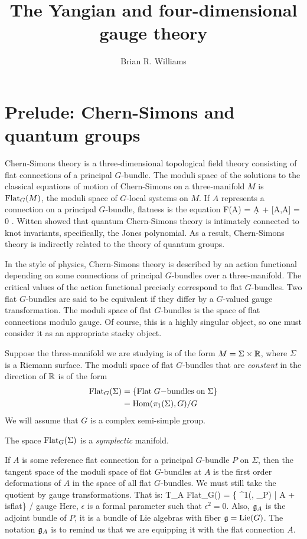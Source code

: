 \documentclass[10pt]{amsart}
\title{The Yangian and four-dimensional gauge theory}
\author{Brian R. Williams}
\date{}
\begin{document}
\maketitle

\section{Prelude: Chern-Simons and quantum groups}

Chern-Simons theory is a three-dimensional topological field theory consisting of flat connections of a principal $G$-bundle. 
The moduli space of the solutions to the classical equations of motion of Chern-Simons on a three-manifold $M$ is ${\rm Flat}_G(M)$, the moduli space of $G$-local systems on $M$. 
If $A$ represents a connection on a principal $G$-bundle, flatness is the equation
\ben 
F(A) = \d A +  [A,A] = 0 .
\een 
Witten \cite{WittenJones} showed that quantum Chern-Simons theory is intimately connected to knot invariants, specifically, the Jones polynomial. 
As a result, Chern-Simons theory is indirectly related to the theory of quantum groups. 

In the style of physics, Chern-Simons theory is described by an action functional depending on some connections of principal $G$-bundles over a three-manifold. 
The critical values of the action functional precisely correspond to flat $G$-bundles. 
Two flat $G$-bundles are said to be equivalent if they differ by a $G$-valued gauge transformation. 
The moduli space of flat $G$-bundles is the space of flat connections modulo gauge. 
Of course, this is a highly singular object, so one must consider it as an appropriate stacky object. 

Suppose the three-manifold we are studying is of the form $M = \Sigma \times \mathbb R$, where $\Sigma$ is a Riemann surface. 
The moduli space of flat $G$-bundles that are {\em constant} in the direction of $\mathbb R$ is of the form
\begin{align*}
{\rm Flat}_G(\Sigma) & = \{{\rm Flat \; }G{\rm -bundles\;on\;}\Sigma\} \\ & = {\rm Hom}(\pi_1(\Sigma), G) / G
\end{align*}
We will assume that $G$ is a complex semi-simple group.

\begin{fact}
The space ${\rm Flat}_G(\Sigma)$ is a {\em symplectic} manifold. 
\end{fact} 

If $A$ is some reference flat connection for a principal $G$-bundle $P$ on $\Sigma$, then the tangent space of the moduli space of flat $G$-bundles at $A$ is the first order deformations of $A$ in the space of all flat $G$-bundles. 
We must still take the quotient by gauge transformations. 
That is:
\ben
T_A {\rm Flat}_G(\Sigma) = \{ \in \Omega^1(\Sigma , \fg_P) \; | \; A + \epsilon {} {\rm \; is\;flat}\} / {\rm gauge}
\een
Here, $\epsilon$ is a formal parameter such that $\epsilon^2 = 0$. 
Also, $\mathfrak g_A$ is the adjoint bundle of $P$, it is a bundle of Lie algebras with fiber $\mathfrak g = {\rm Lie}(G)$. 
The notation $\mathfrak g_A$ is to remind us that we are equipping it with the flat connection $A$. 
\end{document}
